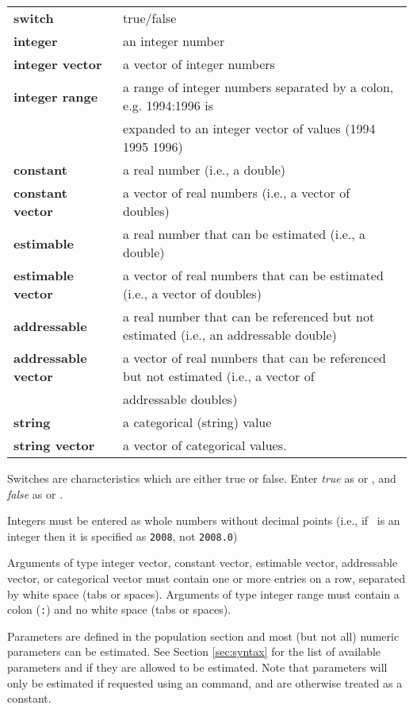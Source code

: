 \begin{tabular}{ll}
\textbf{switch} & true/false \\
\textbf{integer}& an integer number \\
\textbf{integer vector} & a vector of integer numbers \\
\textbf{integer range} & a range of integer numbers separated by a colon, e.g. 1994:1996 is \\ & expanded to an integer vector of values (1994 1995 1996) \\
\textbf{constant} & a real number (i.e., a double) \\
\textbf{constant vector} & a vector of real numbers (i.e., a vector of doubles) \\
\textbf{estimable} & a real number that can be estimated (i.e., a double) \\
\textbf{estimable vector} & a vector of real numbers that can be estimated (i.e., a vector of doubles) \\
\textbf{addressable} & a real number that can be referenced but not estimated (i.e., an addressable double) \\
\textbf{addressable vector} & a vector of real numbers that can be referenced but not estimated (i.e., a vector of \\ & addressable doubles) \\
\textbf{string} & a categorical (string) value \\
\textbf{string vector} & a vector of categorical values.
\end{tabular}

Switches are characteristics which are either true or false. Enter \emph{true} as  or , and \emph{false} as  or .

Integers must be entered as whole numbers without decimal points (i.e., if \ is an integer then it is specified as \texttt{2008}, not \texttt{2008.0})

Arguments of type integer vector, constant vector, estimable vector, addressable vector, or categorical vector must contain one or more entries on a row, separated by white space (tabs or spaces). Arguments of type integer range must contain a colon (\texttt{:}) and no white space (tabs or spaces).

Parameters are defined in the population section and most (but not all) numeric parameters can be estimated. See Section \ref{sec:syntax} for the list of available parameters and if they are allowed to be estimated. Note that parameters will only be estimated if requested using an  command, and are otherwise treated as a constant.

